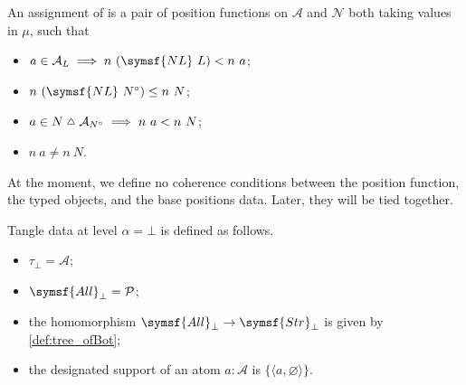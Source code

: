 \begin{definition}
    An assignment of  is a pair of position functions on \( \mathcal A \) and \( \mathcal N \) both taking values in \( \mu \), such that
    \begin{itemize}
        \item \( a \in \mathcal A_L \implies n\ (\symsf{NL}\ L) < n\ a \);
        \item \( n\ (\symsf{NL}\ N^\circ) \leq n\ N \);
        \item \( a \in N \symmdiff \mathcal A_{N^\circ} \implies n\ a < n\ N \);
        \item \( n\ a \neq n\ N \).
    \end{itemize}
\end{definition}
\begin{remark}
    At the moment, we define no coherence conditions between the position function, the typed objects, and the base positions data.
    Later, they will be tied together.
\end{remark}
\begin{definition}
    Tangle data at level \( \alpha = \bot \) is defined as follows.
    \begin{itemize}
        \item \( \tau_\bot = \mathcal A \);
        \item \( \symsf{All}_\bot = \mathcal P \);
        \item the homomorphism \( \symsf{All}_\bot \to \symsf{Str}_\bot \) is given by \cref{def:tree_ofBot};
        \item the designated support of an atom \( a : \mathcal A \) is \( \{\langle a, \varnothing \rangle\} \).
    \end{itemize}
\end{definition}
